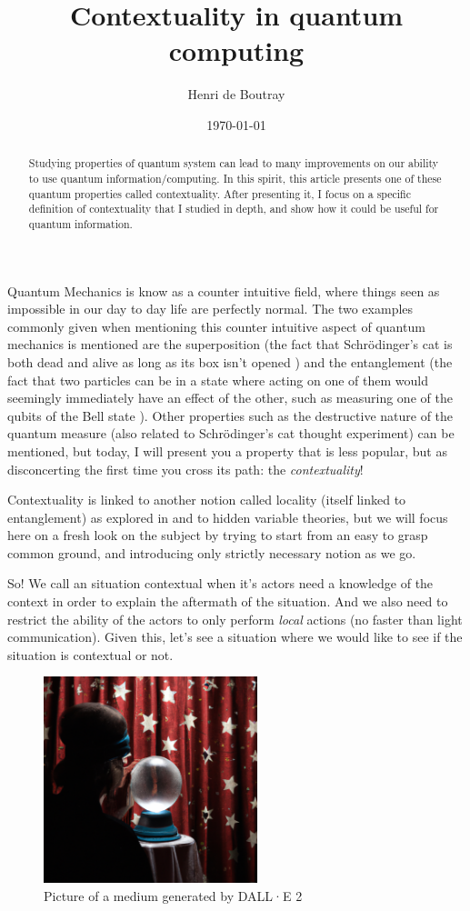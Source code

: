 \documentclass{article}
\title{Contextuality in quantum computing}
\author{Henri de Boutray}
\date{\today}
\begin{document}
\maketitle

\begin{abstract}
Studying properties of quantum system can lead to many improvements on our
ability to use quantum information/computing. In this spirit, this article
presents one of these quantum properties called contextuality. After presenting
it, I focus on a specific definition of contextuality that I studied in depth,
and show how it could be useful for quantum information.
\end{abstract}

Quantum Mechanics is know as a counter intuitive field, where things seen as
impossible in our day to day life are perfectly normal. The two examples
commonly given when mentioning this counter intuitive aspect of quantum
mechanics is mentioned are the superposition (the fact that Schrödinger's cat is
both dead and alive as long as its box isn't opened \cite{Sch35}) and the
entanglement (the fact that two particles can be in a state where acting on one
of them would seemingly immediately have an effect of the other, such as
measuring one of the qubits of the Bell state \cite{EPR35}). Other properties
such as the destructive nature of the quantum measure (also related to
Schrödinger's cat thought experiment) can be mentioned, but today, I will present
you a property that is less popular, but as disconcerting the first time you
cross its path: the \emph{contextuality}!

Contextuality is linked to another notion called locality (itself linked to
entanglement) as explored in \cite{AB11} and to hidden variable theories, but we
will focus here on a fresh look on the subject by trying to start from an easy to
grasp common ground, and introducing only strictly necessary notion as we go.

So! We call an situation contextual when it's actors need a knowledge of the
context in order to explain the aftermath of the situation. And we also need to
restrict the ability of the actors to only perform \emph{local} actions (no
faster than light communication). Given this, let's see a situation where we
would like to see if the situation is contextual or not. 

\begin{figure}[!ht]
\centerline{\includegraphics[height=6cm]{resources/medium.png}}
\caption{Picture of a medium generated by DALL·E 2}
\end{figure}
\end{document}

